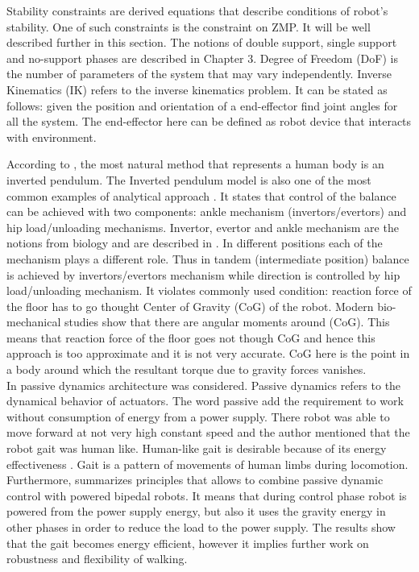 \documentclass[12pt,a4paper]{report}
\begin{document}
		Stability constraints are derived equations that describe conditions of robot's stability. One of such constraints is the constraint on ZMP. It will be well described further in this section.
		The notions of double support, single support and no-support phases are described in Chapter 3.
		Degree of Freedom (DoF) is  the number of parameters of the system that may vary independently.
		Inverse Kinematics (IK) refers to the inverse kinematics problem. It can be stated as follows: given the position and orientation of a end-effector find joint angles for all the system. The end-effector here can be defined as robot device that interacts with environment.

		According to \cite{tang2008analysis}, the most natural method that represents a human body is an inverted pendulum. The Inverted pendulum model is also one of the most common examples of analytical approach \cite{winter1995human}. It states that control of the balance can be achieved with two components: ankle mechanism (invertors/evertors) and hip load/unloading mechanisms. Invertor, evertor and ankle mechanism are the notions from biology and are described in \cite{knight2013difference}.
		In different positions each of the mechanism plays a different role. Thus in tandem (intermediate position) balance is achieved by invertors/evertors mechanism while direction is controlled by hip load/unloading mechanism. It violates commonly used condition: reaction force of the floor has to go thought Center of Gravity (CoG) of the robot. Modern bio-mechanical studies show that there are angular moments around (CoG).  This means that reaction force of the floor goes not though CoG and hence this approach is too approximate and it is not very accurate. CoG here is the point in a body around which the resultant torque due to gravity forces vanishes.\\
		
		In \cite{collins2005bipedal} passive dynamics architecture was considered. Passive dynamics refers to the dynamical behavior of actuators. The word passive add the requirement to work without consumption of energy from a power supply. There robot was able to move forward at  not very high constant speed and the author mentioned that  the robot gait was human like. Human-like gait is desirable because of its energy effectiveness \cite{golliday1977approach}. Gait is a pattern of movements of human limbs during locomotion.\\
		
		Furthermore, \cite{anderson2005powered} summarizes principles that allows to combine passive dynamic control with powered bipedal robots. It means that during control phase robot is powered from  the power supply energy, but also it uses the gravity energy in other phases in order to reduce the load to the power supply. The results show that the gait becomes energy efficient, however it implies further work on robustness and flexibility of walking.\\
\end{document}
